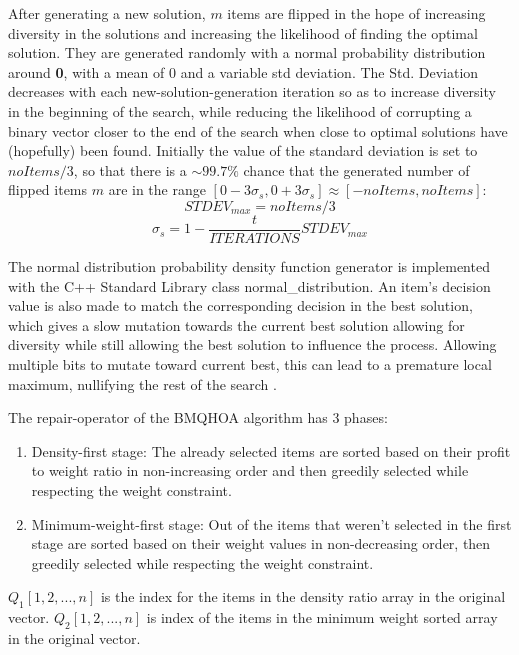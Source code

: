 \documentclass[titlepage]{article}
\begin{document}
After generating a new solution, $m$ items are flipped in the hope of increasing diversity in the solutions and increasing the likelihood of finding the optimal solution. They are generated randomly with a normal probability distribution around \textbf{0}, with a mean of $0$ and a variable std deviation. The Std. Deviation decreases with each new-solution-generation iteration so as to increase diversity in the beginning of the search, while reducing the likelihood of corrupting a binary vector closer to the end of the search when close to optimal solutions have (hopefully) been found. Initially the value of the standard deviation is set to $noItems/3$, so that there is a $\sim 99.7\%$ chance that the generated number of flipped items $m$ are in the range $[0-3\sigma_{s}, 0+3\sigma_{s}] \approx [-noItems, noItems]$:
$$STDEV_{max} = noItems/3$$
$$\sigma_{s} = 1-\frac{t}{ITERATIONS} STDEV_{max}$$


The normal distribution probability density function generator is implemented with the C++ Standard Library class normal\_distribution. An item's decision value is also made to match the corresponding decision in the best solution, which gives a slow mutation towards the current best solution allowing for diversity while still allowing the best solution to influence the process. Allowing multiple bits to mutate toward current best, this can lead to a premature local maximum, nullifying the rest of the search \cite{BMQHOA-article} . 

The repair-operator of the BMQHOA algorithm has 3 phases:
\begin{enumerate}
    \item Density-first stage: The already selected items are sorted based on their profit to weight ratio in non-increasing order and then greedily selected while respecting the weight constraint. 
    \item Minimum-weight-first stage: Out of the items that weren't selected in the first stage are sorted based on their weight values in non-decreasing order, then greedily selected while respecting the weight constraint.   
\end{enumerate}

$Q_{1}[1, 2,...,n]$ is the index for the items in the density ratio array in the original vector. $Q_{2}[1, 2,..., n]$ is index of the items in the minimum weight sorted array in the original vector.
\end{document}
